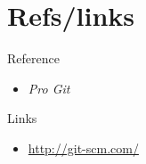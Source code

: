 \documentclass[bigger, presentation]{beamer}
\begin{document}
\section{Refs/links}
\label{sec-8}
\begin{frame}
\begin{block}{Reference}
\label{sec-8-1-1}

\begin{itemize}
\item \emph{Pro Git}
\end{itemize}
\end{block}
\begin{block}{Links}
\label{sec-8-1-2}

\begin{itemize}
\item \href{http://www.emacswiki.org/emacs/}{http://git-scm.com/}
\end{itemize}
\end{block}
\end{frame}
\end{document}
